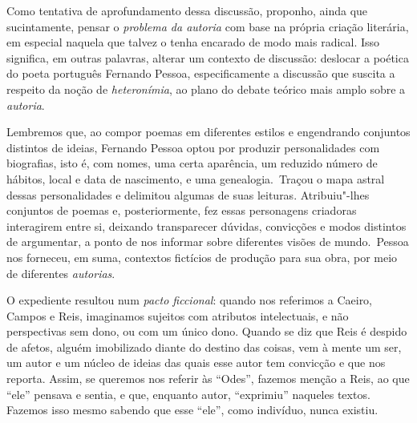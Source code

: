 Como tentativa de aprofundamento dessa discussão, proponho, ainda que
sucintamente, pensar o \emph{problema da autoria} com base na própria
criação literária, em especial naquela que talvez o tenha encarado de
modo mais radical. Isso significa, em outras palavras, alterar um
contexto de discussão: deslocar a poética do poeta português Fernando
Pessoa, especificamente a discussão que suscita a respeito da noção de
\emph{heteronímia}, ao plano do debate teórico mais amplo sobre a
\emph{autoria}.

Lembremos que, ao compor poemas em diferentes estilos e engendrando
conjuntos distintos de ideias, Fernando Pessoa optou por produzir
personalidades com biografias, isto é, com nomes, uma certa aparência,
um reduzido número de hábitos, local e data de nascimento, e uma
genealogia.~Traçou o mapa astral dessas personalidades e delimitou
algumas de suas leituras. Atribuiu"-lhes conjuntos de poemas e,
posteriormente, fez essas personagens criadoras interagirem entre si,
deixando transparecer dúvidas, convicções e modos distintos de
argumentar, a ponto de nos informar sobre diferentes visões de mundo.~Pessoa nos forneceu, em suma, contextos fictícios de produção para sua obra, por meio de diferentes \emph{autorias}.

O expediente resultou num \emph{pacto ficcional}: quando nos referimos a
Caeiro, Campos e Reis, imaginamos sujeitos com atributos intelectuais, e não perspectivas sem dono, ou com um único dono. Quando se diz que Reis
é despido de afetos, alguém imobilizado diante do destino das coisas,
vem à mente um ser, um autor e um núcleo de ideias das quais esse autor
tem convicção e que nos reporta. Assim, se queremos nos referir às
``Odes'', fazemos menção a Reis, ao que ``ele'' pensava e sentia, e que,
enquanto autor, ``exprimiu'' naqueles textos. Fazemos isso mesmo sabendo
que esse ``ele'', como indivíduo, nunca existiu.

